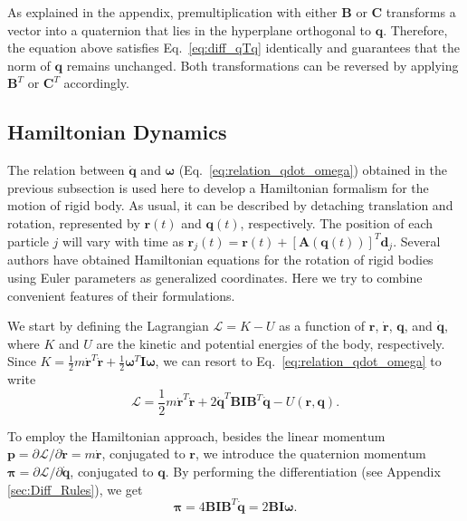 \documentclass[aip,jcp,reprint,amsmath,amssymb]{revtex4-1}
\newcommand{\mt}[1]{\boldsymbol{\mathbf{#1}}}           %
\newcommand{\vt}[1]{\boldsymbol{\mathbf{#1}}}           %
\newcommand{\tr}[1]{#1^T}                               %
\begin{document}
As explained in the appendix, premultiplication with either $\mt B$ or $\mt C$ transforms a vector into a quaternion that lies in the hyperplane orthogonal to $\vt q$. Therefore, the equation above satisfies Eq.~\ref{eq:diff_qTq} identically and guarantees that the norm of $\vt q$ remains unchanged. Both transformations can be reversed by applying $\tr{\vt B}$ or $\tr{\vt C}$ accordingly.

\subsection{Hamiltonian Dynamics}
\label{sec:hamiltonian}

The relation between $\dot{\boldsymbol{q}}$ and $\boldsymbol{\omega}$ (Eq.~\ref{eq:relation_qdot_omega}) obtained in the previous subsection is used here to develop a Hamiltonian formalism for the motion of rigid body. As usual, it can be described by detaching translation and rotation, represented by ${\vt r}(t)$ and ${\vt q}(t)$, respectively. The position of each particle $j$ will vary with time as $\vt r_j(t) = \vt r(t) + \tr{[{\mt A}(\vt q(t))]}\vt d_j$. Several authors have obtained Hamiltonian equations for the rotation of rigid bodies using Euler parameters as generalized coordinates.\cite{Maciejewski1985, Dichmann1996, Miller2002, Ravishankar2004, Nielsen2012} Here we try to combine convenient features of their formulations.

We start by defining the Lagrangian $\mathcal{L} = K - U$ as a function of $\vt r$, $\dot{\vt r}$, $\vt q$, and $\dot{\vt q}$, where $K$ and $U$ are the kinetic and potential energies of the body, respectively. Since $K = \frac{1}{2} m \tr{\dot{\vt r}} \dot{\vt r} + \frac{1}{2} \tr{\vt \omega} \mt I \vt \omega$,\cite{Goldstein2002} we can resort to Eq.~\ref{eq:relation_qdot_omega} to write
\[
\mathcal{L} = \frac{1}{2} m \tr{\dot{\vt r}} \dot{\vt r} + 2 \tr{\dot{\vt q}} \mt B \mt I \tr{\mt B} \dot{\vt q} - U(\vt r, \vt q).
\]

To employ the Hamiltonian approach, besides the linear momentum $\vt p = \partial \mathcal{L}/\partial \dot{\vt r} = m \dot{\vt r}$, conjugated to $\vt r$, we introduce the quaternion momentum $\vt \pi = \partial \mathcal{L}/\partial \dot{\vt q}$, conjugated to $\vt q$.\citep{Goldstein2002} By performing the differentiation (see Appendix \ref{sec:Diff_Rules}), we get
\begin{equation}
\label{eq:conj_momentum}
\vt \pi = 4 \mt B \mt I \tr{\mt B} \dot{\vt q} = 2 \mt B \mt I \vt \omega.
\end{equation}
\end{document}
